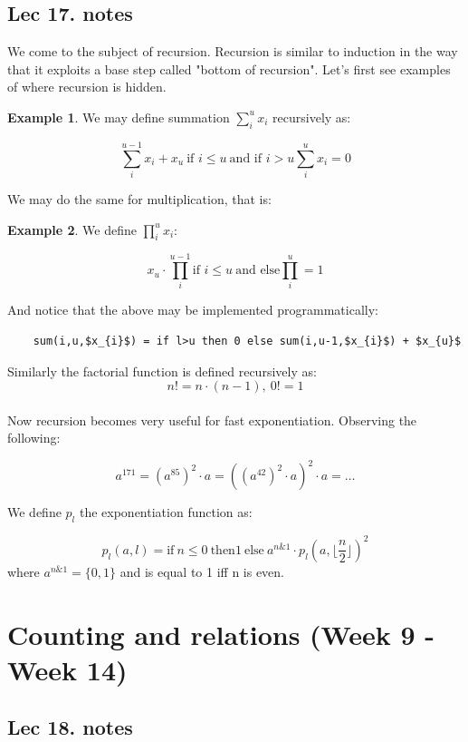 \documentclass[titlepage]{article}
\theoremstyle{definition}
\newcommand{\floor}[1]{\lfloor #1 \rfloor}
\newtheorem{example}{Example}
\numberwithin{equation}{subsection}
\numberwithin{remark}{subsection}
\begin{document}
\subsection{Lec 17. notes}
We come to the subject of recursion. Recursion is similar to induction in the way that it exploits a base step called "bottom of recursion". Let's first see examples of where recursion is hidden. 

\begin{example}
We may define summation $\sum_{i}^{u} x_{i}$ recursively as:

$$ \sum_{i}^{u-1} x_{i} + x_{u} \ \text{if $i \leq u$} \ \text{and if $i > u$} \sum_{i}^{u} x_{i} = 0$$
\end{example}

We may do the same for multiplication, that is:

\begin{example}
We define $\prod_{i}^{u} x_{i} $: 

$$ x_{u} \cdot \prod_{i}^{u-1}  \text{if $i\leq u$} \ \text{and else} \prod_{i}^{u} = 1$$
\end{example}

And notice that the above may be implemented programmatically:

\begin{lstlisting}
    sum(i,u,$x_{i}$) = if l>u then 0 else sum(i,u-1,$x_{i}$) + $x_{u}$
\end{lstlisting}

Similarly the factorial function is defined recursively as:
$$n! = n \cdot (n-1), \ 0!=1$$
\\

Now recursion becomes very useful for fast exponentiation. Observing the following:

$$ a^{171} = (a^{85})^{2} \cdot a = ((a^{42})^{2}\cdot a)^{2} \cdot a = \ldots$$

We define $p_{l}$ the exponentiation function as:

$$ p_{l}(a,l) = \text{if} \ n\leq 0 \ \text{then} 1\ \text{else} \ a^{n\text{&}1}\cdot p_{l}(a,\floor{\frac{n}{2}})^{2}$$ where $a^{n\text{&}1} = \{0,1\}$ and is equal to 1 iff n is even. 

\section{Counting and relations (Week 9 - Week 14)}
\subsection{Lec 18. notes}
\end{document}
